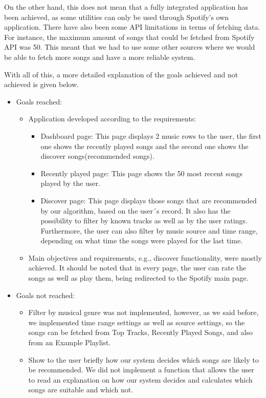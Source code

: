 On the other hand, this does not mean that a fully integrated application has been achieved, as some utilities can only be used through Spotify's own application. There have also been some API limitations in terms of fetching data. For instance, the maximum amount of songs that could be fetched from Spotify API was 50. This meant that we had to use some other sources where we would be able to fetch more songs and have a more reliable system.

With all of this, a more detailed explanation of the goals achieved and not achieved is given below.

\begin{itemize}
    \item Goals reached:
    \begin{itemize}
        \item Application developed according to the requirements:
        \begin{itemize}
            \item Dashboard page: This page displays 2 music rows to the user, the first one shows the recently played songs and the second one shows the discover songs(recommended songs).
            \item Recently played page: This page shows the 50 most recent songs played by the user.
            \item Discover page: This page displays those songs that are recommended by our algorithm, based on the user´s record. It also has the possibility to filter by known tracks as well as by the user ratings. Furthermore, the user can also filter by music source and time range, depending on what time the songs were played for the last time.
        \end{itemize}
        \item Main objectives and requirements, e.g., discover functionality, were mostly achieved. It should be noted that in every page, the user can rate the songs as well as play them, being redirected to the Spotify main page.
    \end{itemize}
    \item Goals not reached:
    \begin{itemize}
        \item Filter by musical genre was not implemented, however, as we said before, we implemented time range settings as well as source settings, so the songs can be fetched from Top Tracks, Recently Played Songs, and also from an Example Playlist.
        \item Show to the user briefly how our system decides which songs are likely to be recommended. We did not implement a function that allows the user to read an explanation on how our system decides and calculates which songs are suitable and which not.

\end{itemize}
\end{itemize}
